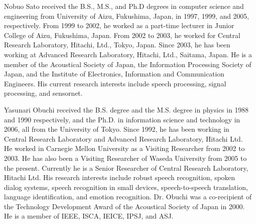 \documentclass[english]{jnlp_1.3e}
\begin{document}
\vspace{-0.5\baselineskip}
\begin{biography}

{Nobuo Sato received the B.S., M.S., and Ph.D degrees in computer science and engineering
from University of Aizu, Fukushima, Japan, in 1997, 1999, and 2005, respectively.
From 1999 to 2002, he worked as a part-time lecturer in Junior College of Aizu, Fukushima, Japan.
From 2002 to 2003, he worked for Central Research Laboratory, Hitachi, Ltd., Tokyo, Japan.
Since 2003, he has been working at Advanced Research Laboratory, Hitachi, Ltd., Saitama, Japan.
He is a member of the Acoustical Society of Japan,
the Information Processing Society of Japan, 
and the Institute of Electronics, Information and Communication Engineers.
His current research interests include speech processing,
signal processing, and sensornet.
}

{Yasunari Obuchi received the B.S. degree and the M.S. degree in physics in 1988 and
1990 respectively, and the Ph.D. in information science and technology
in 2006, all from the University of Tokyo. Since 1992, he has been
working in Central Research Laboratory and Advanced Research
Laboratory, Hitachi Ltd. He worked in Carnegie Mellon University as a
Visiting Researcher from 2002 to 2003. He has also been a Visiting
Researcher of Waseda University from 2005 to the present. Currently he
is a Senior Researcher of Central Research Laboratory, Hitachi Ltd.
His research interests include robust speech recognition, spoken
dialog systems, speech recognition in small devices, speech-to-speech
translation, language identification, and emotion recognition. Dr.
Obuchi was a co-recipient of the Technology Development Award of the
Acoustical Society of Japan in 2000. He is a member of IEEE, ISCA,
IEICE, IPSJ, and ASJ.
}
\end{biography}

\biodate
\end{document}
